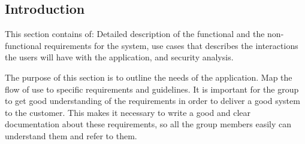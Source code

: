 \subsection{Introduction}
This section contains of: Detailed description of the functional and the non-functional requirements for the system, use 	cases that describes the interactions the users will have with the application, and security analysis. 

The purpose of this section is to outline the needs of the application. Map the flow of use to specific requirements and guidelines. It is important for the group to get good understanding of the requirements in order to deliver a good system to the customer. This makes it necessary to write a good and clear documentation about these requirements, so all the group members easily can understand them and refer to them.
	
